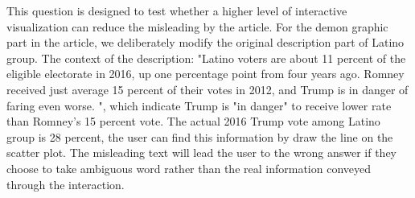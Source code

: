 \documentclass[9pt,journal,compsoc]{IEEEtran}
\begin{document}
This question is designed to test whether a higher level of interactive visualization can reduce the misleading by the article. For the demon graphic part in the article, we deliberately modify the original description part of Latino group. The context of the description: "Latino voters are about 11 percent of the eligible electorate in 2016, up one percentage point from four years ago. Romney received just average 15 percent of their votes in 2012, and Trump is in danger of faring even worse. ",  which indicate Trump is "in danger" to receive lower rate than Romney's 15 percent vote. The actual 2016 Trump vote among Latino group is 28 percent, the user can find this information by draw the line on the scatter plot. The misleading text will lead the user to the wrong answer if they choose to take ambiguous word rather than the real information conveyed through the interaction. 
\end{document}
